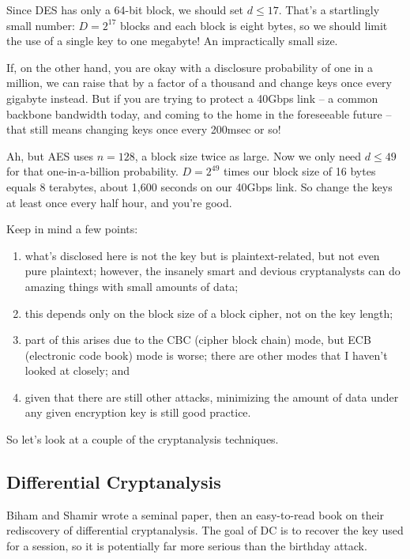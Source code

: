 \documentclass[%
 aip,
 jmp,%
 amsmath,amssymb,
 reprint,%
]{revtex4-1}
\begin{document}
Since DES has only a 64-bit block, we should set $d \le 17$.  That's a
startlingly small number: $D = 2^{17}$ blocks and each block is eight
bytes, so we should limit the use of a single key to one megabyte!
An impractically small size.

If, on the other hand, you are okay with a disclosure probability of
one in a million, we can raise that by a factor of a thousand and
change keys once every gigabyte instead.  But if you are trying to
protect a 40Gbps link -- a common backbone bandwidth today, and coming
to the home in the foreseeable future -- that still means changing
keys once every 200msec or so!

Ah, but AES uses $n = 128$, a block size twice as large.  Now we only
need $d \le 49$ for that one-in-a-billion probability.  $D = 2^{49}$
times our block size of 16 bytes equals 8 terabytes, about 1,600
seconds on our 40Gbps link.  So change the keys at least once every
half hour, and you're good.

Keep in mind a few points:
\begin{enumerate}
\item what's disclosed here is not the key but is plaintext-related, but
   not even pure plaintext; however, the insanely smart and devious
   cryptanalysts can do amazing things with small amounts of data;
\item this depends only on the block size of a block cipher, not on the
   key length;
\item part of this arises due to the CBC (cipher block chain) mode, but
   ECB (electronic code book) mode is worse; there are other modes
   that I haven't looked at closely; and
\item given that there are still other attacks, minimizing the amount of
   data under any given encryption key is still good practice.
\end{enumerate}

So let's look at a couple of the cryptanalysis techniques.

\subsection{Differential Cryptanalysis}

Biham and Shamir wrote a seminal paper, then an easy-to-read book on
their rediscovery of differential cryptanalysis.  The goal of DC is to
recover the key used for a session, so it is potentially far more
serious than the birthday attack.
\end{document}
